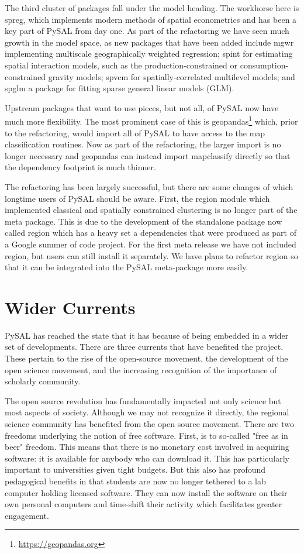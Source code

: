 \documentclass[11pt]{article}
\begin{document}
The third cluster of packages fall under the model heading. The workhorse here
is spreg, which implements modern methods of spatial econometrics and has been a
key part of PySAL from day one. As part of the refactoring we have seen much
growth in the model space, as new packages that have been added include mgwr
implementing multiscale geographically weighted regression; spint for
estimating spatial interaction models, such as the production-constrained or
consumption-constrained gravity models;  spvcm for spatially-correlated
multilevel models; and spglm a package for fitting sparse general linear models
(GLM).


Upstream packages that want to use pieces, but not all, of PySAL now have much
more flexibility. The most prominent case of this is geopandas\footnote{\url{https://geopandas.org}}
which, prior to the refactoring, would import all of PySAL to have access to
the map classification routines. Now as part of the refactoring, the larger
import is no longer necessary and geopandas can instead import mapclassify
directly so that the dependency footprint is much thinner.


The refactoring has been largely successful, but there are some changes of which
longtime users of PySAL should be aware. First, the region module which
implemented classical and spatially constrained clustering is no longer part of
the meta package. This is due to the development of the standalone package now
called region which has a heavy set a dependencies that were produced as part
of a Google summer of code project. For the first meta release we have not
included region, but users can still install it separately. We have plans to
refactor region so that it can be integrated into the PySAL meta-package more
easily.

\section*{Wider Currents}
\label{sec:org701c4d3}
PySAL has reached the state that it has because of being embedded in a wider set
of developments. There are three currents that have benefited the project. These
pertain to the rise of the open-source movement, the development of the open
science movement, and the increasing recognition of the importance of scholarly
community.

The open source revolution has fundamentally impacted not only science but most
aspects of society. Although we may not recognize it directly, the regional
science community has benefited from the open source movement. There are two
freedoms underlying the notion of free software. First, is to so-called "free as in 
beer" freedom. This means that there is no monetary cost involved in acquiring
software: it is available for anybody who can download it. This has
particularly important to universities given tight budgets. But this also has
profound pedagogical benefits in that students are now no longer tethered to a
lab computer holding licensed software. They can now install the software on
their own personal computers and time-shift their activity which facilitates
greater engagement.
\end{document}
